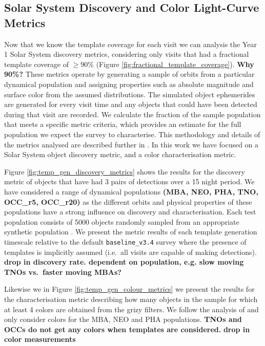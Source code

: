 \documentclass[preprint,linenumbers]{aastex631}
\newcommand{\baseline}{\texttt{baseline\_v3.4}\xspace}
\begin{document}
{		
		\subsection{Solar System Discovery and Color Light-Curve Metrics}
		\label{sec:sso_metrics}
		
		Now that we know the template coverage for each visit we can analysis the Year 1 Solar System discovery metrics, considering only visits that had a fractional template coverage of $\geq 90 \%$ (Figure \ref{fig:fractional_template_coverage}).
		\textbf{Why 90\%?}
		These metrics operate by generating a sample of orbits from a particular dynamical population and assigning properties such as absolute magnitude and surface color from the assumed distributions.
		The simulated object ephemerides are generated for every visit time and any objects that could have been detected during that visit are recorded.
		We calculate the fraction of the sample population that meets a specific metric criteria, which provides an estimate for the full population we expect the survey to characterise.
		This methodology and details of the metrics analysed are described further in \cite{schwambTuningLegacySurvey2023}.
		In this work we have focused on a Solar System object discovery metric, and a color characterisation metric.
		
		Figure \ref{fig:temp_gen_discovery_metrics} shows the results for the discovery metric of objects that have had 3 pairs of detections over a 15 night period.
		We have considered a range of dynamical populations \textbf{(MBA, NEO, PHA, TNO, OCC\_r5, OCC\_r20)} as the different orbits and physical properties of these populations have a strong influence on discovery and characterisation.
		Each test population consists of 5000 objects randomly sampled from an appropriate synthetic population \cite[see Section 2.2 of][for more details]{schwambTuningLegacySurvey2023}.
		We present the metric results of each template generation timescale relative to the default \baseline survey where the presence of templates is implicitly assumed (i.e.\ all visits are capable of making detections).
		\textbf{drop in discovery rate. dependent on population, e.g. slow moving TNOs vs.\ faster moving MBAs?}
		
		Likewise we in Figure \ref{fig:temp_gen_colour_metrics} we present the results for the characterisation metric describing how many objects in the sample for which at least 4 colors are obtained from the grizy filters.
		We follow the analysis of \cite{schwambTuningLegacySurvey2023} and only consider colors for the MBA, NEO and PHA populations.
		\textbf{TNOs and OCCs do not get any colors when templates are considered.}
		\textbf{drop in color measurements}
		
}
\end{document}
